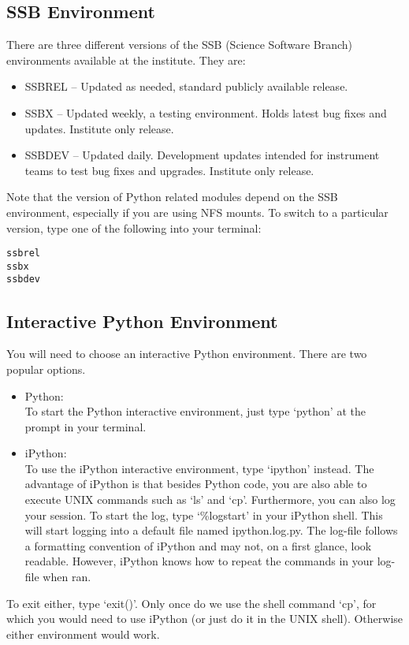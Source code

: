 \subsection{SSB Environment}
There are three different versions of the SSB (Science Software Branch) environments
available at the institute.  They are:
\begin{itemize}
\item SSBREL -- Updated as needed, standard publicly available release.
\item SSBX -- Updated weekly, a testing environment.  Holds latest
  bug fixes and updates.  Institute only release.
\item SSBDEV -- Updated daily.  Development updates intended for
  instrument teams to test bug fixes and upgrades.  Institute only
  release. 
\end{itemize}
Note that the version of Python related modules depend on the SSB
environment, especially if you are using NFS mounts.  To switch
to a particular version, type one of the following into your terminal: 
\begin{alltt}
\termtab ssbrel
\termtab ssbx
\termtab ssbdev
\end{alltt}

\subsection{Interactive Python Environment}
You will need to choose an interactive Python environment.  There are
two popular options.
\begin{itemize}
\item Python: \\
  To start the Python interactive environment, just type `python' at
  the prompt in your terminal.
\item iPython: \\
  To use the iPython interactive environment, type `ipython' instead.
  The advantage of iPython is that besides Python code, you are also
  able to execute UNIX commands such as `ls' and `cp'.  Furthermore,
  you can also log your session.  To start the log, type `\%logstart'
  in your iPython shell.  This will start logging into a default file
  named ipython.log.py.  The log-file follows a formatting convention
  of iPython and may not, on a first glance, look readable. However,
  iPython knows how to repeat the commands in your log-file when ran.
\end{itemize}
To exit either, type `exit()'.  Only once do we use the shell command
`cp', for which you would need to use iPython (or just do it in the
UNIX shell).  Otherwise either environment would work.

